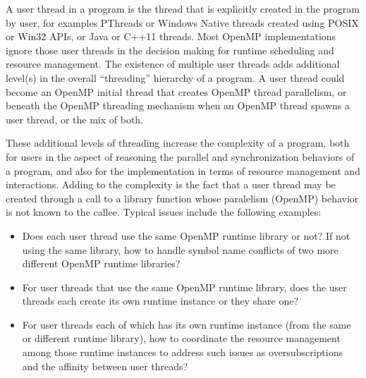 A user thread in a program is the thread that is explicitly created in the program by user, for examples PThreads or Windows Native threads created 
using POSIX or Win32 APIs, or Java or C++11 threads. 
Most OpenMP implementations ignore those user threads in the decision making for runtime scheduling and resource management. 
The existence of multiple user threads adds additional level(s) in the overall ``threading''
hierarchy of a program. %
A user thread could become an OpenMP initial thread that creates OpenMP thread
parallelism, or beneath the OpenMP threading mechanism when an OpenMP thread spawns 
a user thread, or the mix of both. 

These additional levels of threading increase the complexity of a program, both for 
users in the aspect of reasoning the parallel and synchronization behaviors of a program, 
and also for the implementation in terms of resource management and 
interactions. Adding to the complexity is the fact that a user thread may be created 
through a call to a library function whose paralelism (OpenMP) behavior is not known to 
the callee. Typical issues include the following examples: 
\begin{itemize}
\item Does each user thread use the same OpenMP runtime library or not? 
	If not using the same library, how to handle symbol name 
	conflicts of two more different OpenMP runtime libraries? 
\item For user threads that use the same OpenMP runtime library, does the user threads each create its own runtime instance or they share one?
\item For user threads each of which has its own runtime instance (from the same or 
	different runtime library), how to coordinate the resource management among those
	runtime instances to address such issues as oversubscriptions and the affinity
	between user threads?
\end{itemize}

